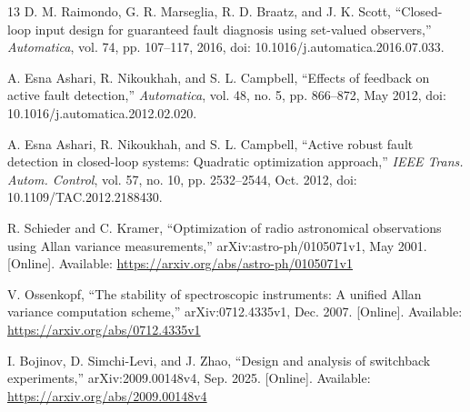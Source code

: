 \begin{thebibliography}{13}
D. M. Raimondo, G. R. Marseglia, R. D. Braatz, and J. K. Scott,
``Closed-loop input design for guaranteed fault diagnosis using set-valued
observers,'' \emph{Automatica}, vol. 74, pp. 107--117, 2016,
doi: 10.1016/j.automatica.2016.07.033.

A. Esna Ashari, R. Nikoukhah, and S. L. Campbell,
``Effects of feedback on active fault detection,'' \emph{Automatica},
vol. 48, no. 5, pp. 866--872, May 2012,
doi: 10.1016/j.automatica.2012.02.020.

A. Esna Ashari, R. Nikoukhah, and S. L. Campbell,
``Active robust fault detection in closed-loop systems: Quadratic optimization
approach,'' \emph{IEEE Trans. Autom. Control}, vol. 57, no. 10,
pp. 2532--2544, Oct. 2012, doi: 10.1109/TAC.2012.2188430.

R. Schieder and C. Kramer,
``Optimization of radio astronomical observations using Allan variance measurements,''
arXiv:astro-ph/0105071v1, May 2001.
[Online]. Available: \url{https://arxiv.org/abs/astro-ph/0105071v1}

V. Ossenkopf,
``The stability of spectroscopic instruments: A unified Allan variance computation scheme,''
arXiv:0712.4335v1, Dec. 2007.
[Online]. Available: \url{https://arxiv.org/abs/0712.4335v1}

I. Bojinov, D. Simchi-Levi, and J. Zhao,
``Design and analysis of switchback experiments,''
arXiv:2009.00148v4, Sep. 2025.
[Online]. Available: \url{https://arxiv.org/abs/2009.00148v4}

\end{thebibliography}
